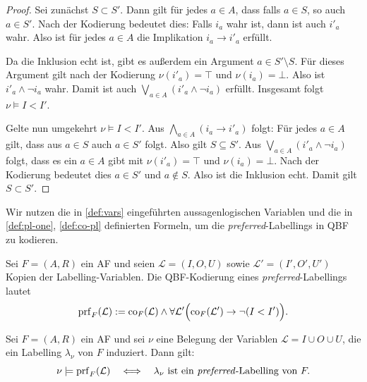 \begin{proof}
    Sei zunächst \(S\subset S'\). Dann gilt für jedes \(a\in A\), dass
    falls \(a\in S\), so auch \(a\in S'\). Nach der Kodierung bedeutet dies:
    Falls \(i_a\) wahr ist, dann ist auch \(i'_a\) wahr. Also ist für jedes
    \(a\in A\) die Implikation \(i_a \rightarrow i'_a\) erfüllt.

    Da die Inklusion echt ist, gibt es außerdem ein Argument
    \(a\in S'\setminus S\). Für dieses Argument gilt nach der Kodierung
    \(\nu(i'_a)=\top\) und \(\nu(i_a)=\bot\). Also ist \(i'_a \land \neg i_a\)
    wahr. Damit ist auch \(\bigvee_{a\in A}(i'_a \land \neg i_a)\)
    erfüllt. 
    Insgesamt folgt \(\nu\models I<I'\).

    Gelte nun umgekehrt \(\nu\models I<I'\). Aus \(\bigwedge_{a\in A}(i_a \rightarrow i'_a)\)
    folgt: Für jedes \(a\in A\) gilt, dass aus \(a\in S\) auch
    \(a\in S'\) folgt. Also gilt \(S\subseteq S'\).
    Aus \(\bigvee_{a\in A}(i'_a \land \neg i_a)\)
    folgt, dass es ein \(a\in A\) gibt mit \(\nu(i'_a)=\top\) und
    \(\nu(i_a)=\bot\). Nach der Kodierung bedeutet dies
    \(a\in S'\) und \(a\notin S\). Also ist die Inklusion echt.
    Damit gilt \(S\subset S'\).
\end{proof}

Wir nutzen die in \ref{def:vars} eingeführten aussagenlogischen Variablen und die in \ref{def:pl-one}, \ref{def:co-pl} definierten
Formeln, um die \textit{preferred}-Labellings in QBF zu kodieren. 

\begin{Definition}
    \label{def:prf-pl}
    Sei \(F=(A,R)\) ein AF und seien
    \(\mathcal{L}=(I,O,U)\) sowie
    \(\mathcal{L}'=(I',O',U')\) Kopien der Labelling-Variablen.
    Die QBF-Kodierung eines \textit{preferred}-Labellings lautet
    \[
    \mathrm{prf}_F(\mathcal{L})
    :=
    \mathrm{co}_F(\mathcal{L})
    \land
    \forall \mathcal{L}'
    \Bigl(
        \mathrm{co}_F(\mathcal{L}') \rightarrow \neg (I < I')
    \Bigr).
    \]
\end{Definition}

\begin{Lemma}
    \label{lem:prf-pl-correct}
    Sei \(F=(A,R)\) ein AF und sei \(\nu\) eine Belegung der Variablen
    \(\mathcal{L}=I\cup O\cup U\), die ein Labelling
    \(\lambda_\nu\) von \(F\) induziert. Dann gilt:
    \[
        \nu \models \mathrm{prf}_F(\mathcal{L})
        \quad\Longleftrightarrow\quad
        \lambda_\nu
        \text{ ist ein \textit{preferred}-Labelling von } F.
    \]
\end{Lemma}


